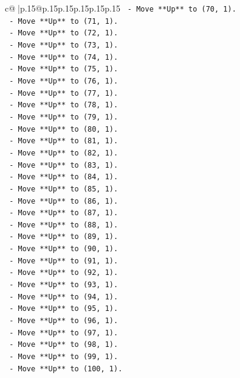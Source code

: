 \documentclass{article}
\begin{document}
{\begin{supertabular}{c@{$\;$}|p{.15\linewidth}@{}p{.15\linewidth}p{.15\linewidth}p{.15\linewidth}p{.15\linewidth}p{.15\linewidth}}
{{{\texttt{    {-} Move **Up** to (70, 1).} \\
\texttt{    {-} Move **Up** to (71, 1).} \\
\texttt{    {-} Move **Up** to (72, 1).} \\
\texttt{    {-} Move **Up** to (73, 1).} \\
\texttt{    {-} Move **Up** to (74, 1).} \\
\texttt{    {-} Move **Up** to (75, 1).} \\
\texttt{    {-} Move **Up** to (76, 1).} \\
\texttt{    {-} Move **Up** to (77, 1).} \\
\texttt{    {-} Move **Up** to (78, 1).} \\
\texttt{    {-} Move **Up** to (79, 1).} \\
\texttt{    {-} Move **Up** to (80, 1).} \\
\texttt{    {-} Move **Up** to (81, 1).} \\
\texttt{    {-} Move **Up** to (82, 1).} \\
\texttt{    {-} Move **Up** to (83, 1).} \\
\texttt{    {-} Move **Up** to (84, 1).} \\
\texttt{    {-} Move **Up** to (85, 1).} \\
\texttt{    {-} Move **Up** to (86, 1).} \\
\texttt{    {-} Move **Up** to (87, 1).} \\
\texttt{    {-} Move **Up** to (88, 1).} \\
\texttt{    {-} Move **Up** to (89, 1).} \\
\texttt{    {-} Move **Up** to (90, 1).} \\
\texttt{    {-} Move **Up** to (91, 1).} \\
\texttt{    {-} Move **Up** to (92, 1).} \\
\texttt{    {-} Move **Up** to (93, 1).} \\
\texttt{    {-} Move **Up** to (94, 1).} \\
\texttt{    {-} Move **Up** to (95, 1).} \\
\texttt{    {-} Move **Up** to (96, 1).} \\
\texttt{    {-} Move **Up** to (97, 1).} \\
\texttt{    {-} Move **Up** to (98, 1).} \\
\texttt{    {-} Move **Up** to (99, 1).} \\
\texttt{    {-} Move **Up** to (100, 1).} \\
}}}
\end{supertabular}}
\end{document}

